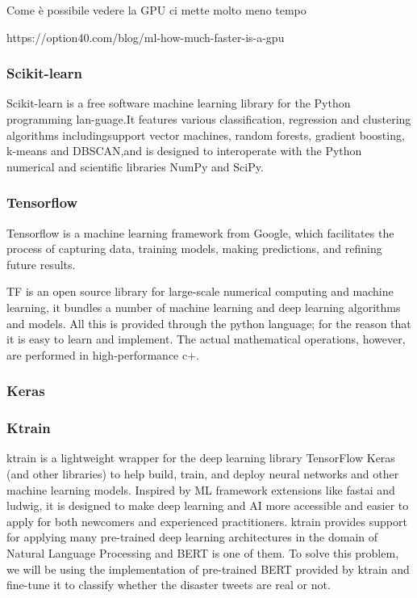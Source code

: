 Come è possibile vedere la GPU ci mette molto meno tempo 

https://option40.com/blog/ml-how-much-faster-is-a-gpu


\subsubsection{Scikit-learn}
Scikit-learn is  a  free  software  machine  learning  library  for  the  Python  programming  lan-guage.It features various classification, regression and clustering algorithms includingsupport vector machines, random forests, gradient boosting, k-means and DBSCAN,and  is  designed  to  interoperate  with  the  Python  numerical  and  scientific  libraries NumPy and SciPy.

\subsubsection{Tensorflow}
Tensorflow is a machine learning framework from Google, which facilitates the process of capturing data, training models, making predictions, and refining future results.

TF is an open source library for large-scale numerical computing and machine learning, it bundles a number of machine learning and deep learning algorithms and models.
All this is provided through the python language; for the reason that it is easy to learn and implement.
The actual mathematical operations, however, are performed in high-performance c+.
\subsubsection{Keras}

\subsubsection{Ktrain}
ktrain is a lightweight wrapper for the deep learning library TensorFlow Keras (and other libraries) to help build, train, and deploy neural networks and other machine learning models. Inspired by ML framework extensions like fastai and ludwig, it is designed to make deep learning and AI more accessible and easier to apply for both newcomers and experienced practitioners.
ktrain provides support for applying many pre-trained deep learning architectures in the domain of Natural Language Processing and BERT is one of them. To solve this problem, we will be using the implementation of pre-trained BERT provided by ktrain and fine-tune it to classify whether the disaster tweets are real or not.

